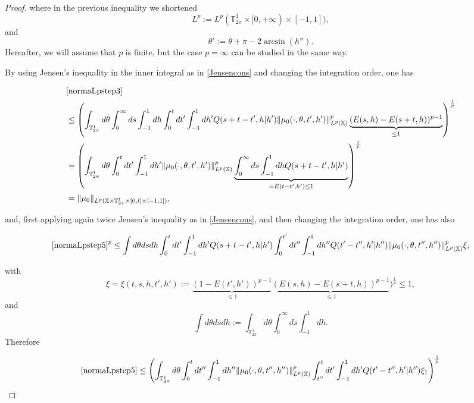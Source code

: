 \documentclass[a4paper,10pt,reqno]{amsart}
\numberwithin{equation}{subsection}
\numberwithin{figure}{subsection}
\begin{document}
\begin{proof}
where in the previous inequality we shortened
\[
L^p:=L^p(\mathbb{T}^1_{2\pi}\times[0,+\infty)\times[-1,1]),
\]
and
\[
\theta':=\theta+\pi-2\arcsin(h'').
\]
Hereafter, we will assume that $p$ is finite, but the case $p=\infty$ can be studied in the same way.

By using Jensen's inequality in the inner integral as in \eqref{Jensencons} and changing the integration order, one has

{\tiny\begin{align*}
&\eqref{normaLpstep3}
\\
&\leq\left(\int_{\mathbb{T}^1_{2\pi}}d\theta\int_0^{\infty}ds\int_{-1}^1dh\int_0^tdt'\int_{-1}^1dh'Q(s+t-t',h|h')\|\mu_0(\cdot,\theta,t',h')\|_{L^p(\mathbb{X})}^p\underbrace{(E(s,h)-E(s+t,h))^{p-1}}_{\leq1}\right)^{\frac{1}{p}}
\\
&=\left(\int_{\mathbb{T}^1_{2\pi}}d\theta\int_0^tdt'\int_{-1}^1dh'\|\mu_0(\cdot,\theta,t',h')\|_{L^p(\mathbb{X})}^p\underbrace{\int_0^{\infty}ds\int_{-1}^1dhQ(s+t-t',h|h')}_{=E(t-t',h')\leq1}\right)^{\frac{1}{p}}
\\
&=\|\mu_0\|_{L^p(\mathbb{X}\times\mathbb{T}^1_{2\pi}\times[0,t]\times[-1,1])},
\end{align*}}

and, first applying again twice Jensen's inequality as in \eqref{Jensencons}, and then changing the integration order, one has also

{\tiny\begin{align*}
\eqref{normaLpstep5}^p\leq\int d\theta dsdh\int_0^tdt'\int_{-1}^1dh'Q(s+t-t',h|h')\int_0^{t'}dt''\int_{-1}^1dh''Q(t'-t'',h'|h'')\|\mu_0(\cdot,\theta,t'',h'')\|_{L^p(\mathbb{X})}^p\xi,
\end{align*}}

with
\[
\xi=\xi(t,s,h,t',h'):=\underbrace{(1-E(t',h'))^{p-1}}_{\leq1}\underbrace{(E(s,h)-E(s+t,h))^{p-1}}_{\leq 1})^{\frac{1}{p}}\leq1,
\]
and
\[
\int d\theta dsdh:=\int_{\mathbb{T}^1_{2\pi}}d\theta\int_0^{\infty}ds\int_{-1}^1dh.
\]
Therefore

{\small\begin{align*}
\eqref{normaLpstep5}\leq\left(\int_{\mathbb{T}^1_{2\pi}}d\theta\int_0^tdt''\int_{-1}^1dh''\|\mu_0(\cdot,\theta,t'',h'')\|_{L^p(\mathbb{X})}^p\int_{t''}^tdt'\int_{-1}^1dh'Q(t'-t'',h'|h'')\xi_1\right)^{\frac{1}{p}}
\end{align*}}


\end{proof}
\end{document}
